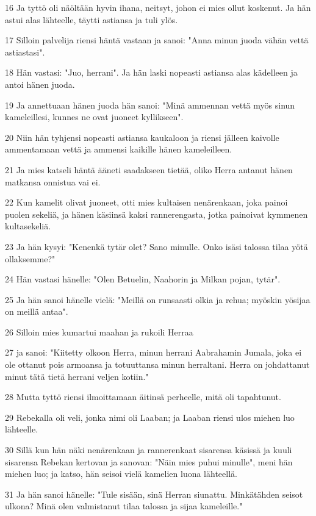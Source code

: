 \par 16 Ja tyttö oli näöltään hyvin ihana, neitsyt, johon ei mies ollut koskenut. Ja hän astui alas lähteelle, täytti astiansa ja tuli ylös.
\par 17 Silloin palvelija riensi häntä vastaan ja sanoi: "Anna minun juoda vähän vettä astiastasi".
\par 18 Hän vastasi: "Juo, herrani". Ja hän laski nopeasti astiansa alas kädelleen ja antoi hänen juoda.
\par 19 Ja annettuaan hänen juoda hän sanoi: "Minä ammennan vettä myös sinun kameleillesi, kunnes ne ovat juoneet kyllikseen".
\par 20 Niin hän tyhjensi nopeasti astiansa kaukaloon ja riensi jälleen kaivolle ammentamaan vettä ja ammensi kaikille hänen kameleilleen.
\par 21 Ja mies katseli häntä ääneti saadakseen tietää, oliko Herra antanut hänen matkansa onnistua vai ei.
\par 22 Kun kamelit olivat juoneet, otti mies kultaisen nenärenkaan, joka painoi puolen sekeliä, ja hänen käsiinsä kaksi rannerengasta, jotka painoivat kymmenen kultasekeliä.
\par 23 Ja hän kysyi: "Kenenkä tytär olet? Sano minulle. Onko isäsi talossa tilaa yötä ollaksemme?"
\par 24 Hän vastasi hänelle: "Olen Betuelin, Naahorin ja Milkan pojan, tytär".
\par 25 Ja hän sanoi hänelle vielä: "Meillä on runsaasti olkia ja rehua; myöskin yösijaa on meillä antaa".
\par 26 Silloin mies kumartui maahan ja rukoili Herraa
\par 27 ja sanoi: "Kiitetty olkoon Herra, minun herrani Aabrahamin Jumala, joka ei ole ottanut pois armoansa ja totuuttansa minun herraltani. Herra on johdattanut minut tätä tietä herrani veljen kotiin."
\par 28 Mutta tyttö riensi ilmoittamaan äitinsä perheelle, mitä oli tapahtunut.
\par 29 Rebekalla oli veli, jonka nimi oli Laaban; ja Laaban riensi ulos miehen luo lähteelle.
\par 30 Sillä kun hän näki nenärenkaan ja rannerenkaat sisarensa käsissä ja kuuli sisarensa Rebekan kertovan ja sanovan: "Näin mies puhui minulle", meni hän miehen luo; ja katso, hän seisoi vielä kamelien luona lähteellä.
\par 31 Ja hän sanoi hänelle: "Tule sisään, sinä Herran siunattu. Minkätähden seisot ulkona? Minä olen valmistanut tilaa talossa ja sijaa kameleille."
